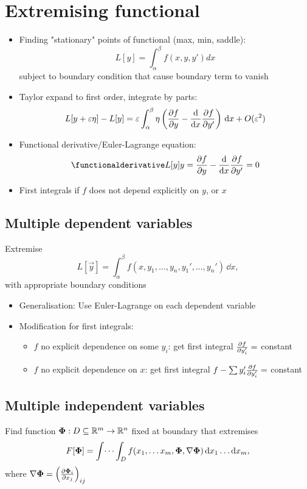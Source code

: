 \section{Extremising functional}
\begin{itemize}
    \item Finding "stationary" points of functional (max, min, saddle): \[L[y] = \int_\alpha^\beta f(x,y,y') dx\] subject to boundary condition that cause boundary term to vanish
    \item Taylor expand to first order, integrate by parts:
          \[L[y+ \varepsilon \eta] - L[y] = \varepsilon \int_\alpha^\beta \eta \left(\frac{\partial{f}}{\partial{y}} - \frac{\mathrm{d}{}}{\mathrm{d}{x}} \frac{\partial{f}}{\partial{y'}} \right) \, \mathrm{d} x + O(\varepsilon^2)\]
    \item Functional derivative/Euler-Lagrange equation: \[\fdv{L[y]}{y} = \pdv{f}{y} - \odv{}{x} \pdv{f}{y'} =0\]
    \item First integrals if $f$ does not depend explicitly on $y$, or $x$
\end{itemize}


\subsection*{Multiple dependent variables}
Extremise \[ L[\vec{y}] = \int_\alpha^\beta f(x,y_1,\dots,y_n,y_1',\dots,y_n') \, \dd x,\] with appropriate boundary conditions

\begin{itemize}
    \item Generalisation: Use Euler-Lagrange on each dependent variable
    \item Modification for first integrals:
          \begin{itemize}
              \item $f$ no explicit dependence on some $y_i$: get first integral $\frac{\partial{f}}{\partial{y_i'}} =$ constant
              \item $f$ no explicit dependence on $x$: get first integral $f - \sum y_i' \frac{\partial{f}}{\partial{y_i'}} =$ constant
          \end{itemize}
\end{itemize}

\subsection*{Multiple independent variables}
Find function $\boldsymbol{\mathbf{\Phi}}: D \subseteq \mathbb{R}^m \to \mathbb{R}^n$ fixed at boundary that extremises
\[F[\boldsymbol{\mathbf{\Phi}}] = \int \dots \int_D f(x_1, \dots x_m, \boldsymbol{\mathbf{\Phi}}, \mathbf{\nabla} \boldsymbol{\mathbf{\Phi}} ) \, \mathrm{d} x_1 \dots \mathrm{d} x_m, \] where $\mathbf{\nabla} \boldsymbol{\mathbf{\Phi}} = \left( \frac{\partial{\boldsymbol{\mathbf{\Phi}}_i}}{\partial{x_j}}\right)_{ij}$

